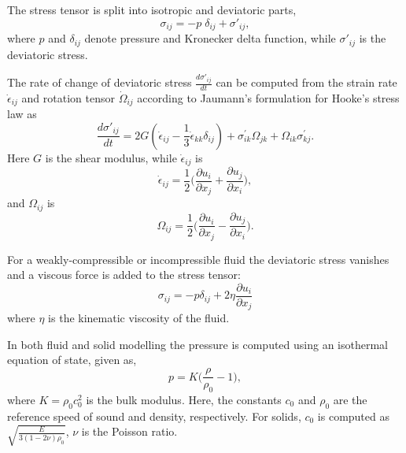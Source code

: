 \documentclass[preprint,12pt]{elsarticle}
\begin{document}
The stress tensor is split into isotropic and deviatoric parts,
\begin{equation}
  \label{eq:stress_tensor_decomposition}
  \sigma_{ij} = - p \; \delta_{ij} + \sigma'_{ij},
\end{equation}
where $p$ and $\delta_{ij}$ denote pressure and Kronecker delta function, while
$\sigma'_{ij}$ is the deviatoric stress.

The rate of change of deviatoric stress $\frac{d \sigma'_{ij}}{dt}$ can be
computed from the strain rate $\dot{\epsilon}_{ij}$ and rotation tensor
$\dot{\Omega}_{ij}$ according to Jaumann's formulation for Hooke's stress law
as
\begin{equation}
  \label{eq:jaumann-stress-rate}
  \frac{d \sigma'_{ij}}{dt} = 2G (\dot{\epsilon}_{ij} - \frac{1}{3}
  \dot{\epsilon}_{kk} \delta_{ij}) + \sigma^{'}_{ik}  \Omega_{jk} +
  \Omega_{ik} \sigma^{'}_{kj}.
\end{equation}
Here $G$ is the shear modulus, while $\dot{\epsilon}_{ij}$ is
\begin{equation}
  \label{eq:strain-tensor}
  \dot{\epsilon}_{ij} = \frac{1}{2} \bigg(\frac{\partial u_i}{\partial x_j} +
  \frac{\partial u_j}{\partial x_i} \bigg),
\end{equation}
and $\Omega_{ij}$ is
\begin{equation}
  \label{eq:rotational-tensor}
  \Omega_{ij} = \frac{1}{2} \bigg(\frac{\partial u_i}{\partial x_j} -
  \frac{\partial u_j}{\partial x_i} \bigg).
\end{equation}

For a weakly-compressible or incompressible fluid the deviatoric stress
vanishes and a viscous force is added to the stress tensor:
\begin{equation}
  \label{eq:fluid-stress-decomposition}
  \sigma_{ij} = - p \delta_{ij} + 2 \eta \frac{\partial u_i}{\partial x_j}
\end{equation}
where $\eta$ is the kinematic viscosity of the fluid.

In both fluid and solid modelling the pressure is computed using an
isothermal equation of state, given as,
\begin{equation}
  \label{eq:pressure-equation}
  p = K \bigg(\frac{\rho}{\rho_{0}} - 1 \bigg),
\end{equation}
where $K = \rho_{0} c_0^2$ is the bulk modulus. Here, the constants $c_0$ and
$\rho_0$ are the reference speed of sound and density, respectively. For solids,
$c_0$ is computed as $\sqrt{\frac{E}{3 (1 - 2 \nu)\rho_{0}}}$, $\nu$ is the
Poisson ratio.
\end{document}
